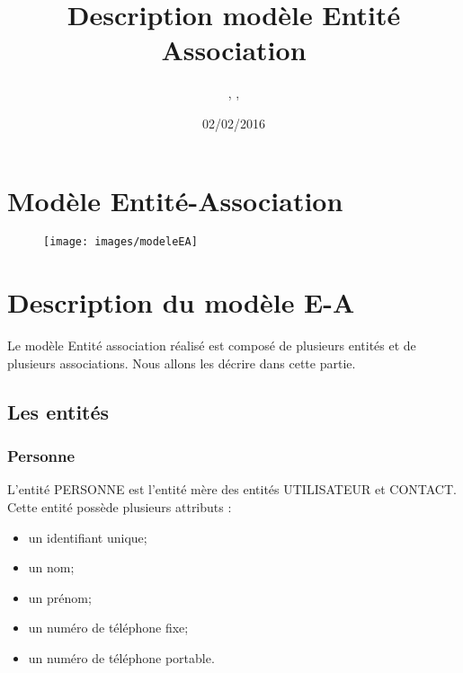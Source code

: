 \documentclass[asi, sansVersion]{picINSA}
\begin{document}
\title{Description modèle Entité Association}
\author{\Florian, \Mathieu, \Julie}
\date{02/02/2016} 

\maketitle

\tableofcontents

\chapter{Modèle Entité-Association}

\begin{landscape}
\begin{figure}
	\centering
	\texttt{[image: images/modeleEA]}
	\caption{\label{modele}}
\end{figure}
\end{landscape}

\chapter{Description du modèle E-A}

Le modèle Entité association réalisé est composé de plusieurs entités et de plusieurs associations. Nous allons les décrire dans cette partie. \\ 

\section{Les entités}

\subsection*{Personne}

L'entité PERSONNE est l'entité mère des entités UTILISATEUR et CONTACT. \\
Cette entité possède plusieurs attributs : 
\begin{itemize}
\item un identifiant unique;
\item un nom; %
\item un prénom; %
\item un numéro de téléphone fixe; %
\item un numéro de téléphone portable. %
\end{itemize}
\end{document}
